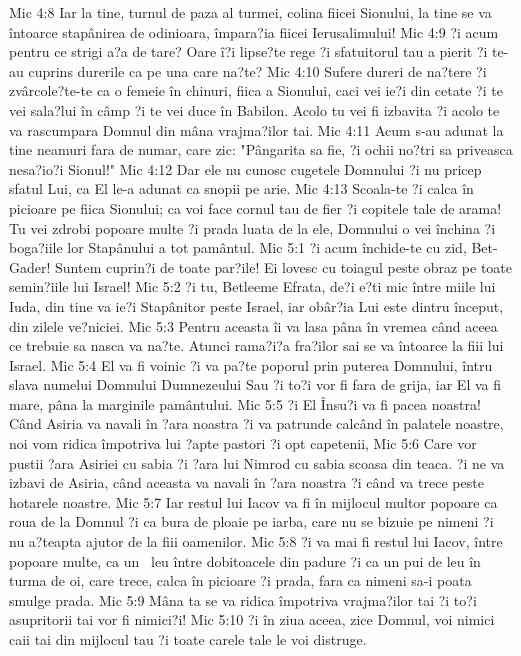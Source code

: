 Mic 4:8  Iar la tine, turnul de paza al turmei, colina fiicei Sionului, la tine se va întoarce stapânirea de odinioara, împara?ia fiicei Ierusalimului!
Mic 4:9  ?i acum pentru ce strigi a?a de tare? Oare î?i lipse?te rege ?i sfatuitorul tau a pierit ?i te-au cuprins durerile ca pe una care na?te?
Mic 4:10  Sufere dureri de na?tere ?i zvârcole?te-te ca o femeie în chinuri, fiica a Sionului, caci vei ie?i din cetate ?i te vei sala?lui în câmp ?i te vei duce în Babilon. Acolo tu vei fi izbavita ?i acolo te va rascumpara Domnul din mâna vrajma?ilor tai.
Mic 4:11  Acum s-au adunat la tine neamuri fara de numar, care zic: "Pângarita sa fie, ?i ochii no?tri sa priveasca nesa?io?i Sionul!"
Mic 4:12  Dar ele nu cunosc cugetele Domnului ?i nu pricep sfatul Lui, ca El le-a adunat ca snopii pe arie.
Mic 4:13  Scoala-te ?i calca în picioare pe fiica Sionului; ca voi face cornul tau de fier ?i copitele tale de arama! Tu vei zdrobi popoare multe ?i prada luata de la ele, Domnului o vei închina ?i boga?iile lor Stapânului a tot pamântul.
Mic 5:1  ?i acum închide-te cu zid, Bet-Gader! Suntem cuprin?i de toate par?ile! Ei lovesc cu toiagul peste obraz pe toate semin?iile lui Israel!
Mic 5:2  ?i tu, Betleeme Efrata, de?i e?ti mic între miile lui Iuda, din tine va ie?i Stapânitor peste Israel, iar obâr?ia Lui este dintru început, din zilele ve?niciei.
Mic 5:3  Pentru aceasta îi va lasa pâna în vremea când aceea ce trebuie sa nasca va na?te. Atunci rama?i?a fra?ilor sai se va întoarce la fiii lui Israel.
Mic 5:4  El va fi voinic ?i va pa?te poporul prin puterea Domnului, întru slava numelui Domnului Dumnezeului Sau ?i to?i vor fi fara de grija, iar El va fi mare, pâna la marginile pamântului.
Mic 5:5  ?i El Însu?i va fi pacea noastra! Când Asiria va navali în ?ara noastra ?i va patrunde calcând în palatele noastre, noi vom ridica împotriva lui ?apte pastori ?i opt capetenii,
Mic 5:6  Care vor pustii ?ara Asiriei cu sabia ?i ?ara lui Nimrod cu sabia scoasa din teaca. ?i ne va izbavi de Asiria, când aceasta va navali în ?ara noastra ?i când va trece peste hotarele noastre.
Mic 5:7  Iar restul lui Iacov va fi în mijlocul multor popoare ca roua de la Domnul ?i ca bura de ploaie pe iarba, care nu se bizuie pe nimeni ?i nu a?teapta ajutor de la fiii oamenilor.
Mic 5:8  ?i va mai fi restul lui Iacov, între popoare multe, ca un  leu între dobitoacele din padure ?i ca un pui de leu în turma de oi, care trece, calca în picioare ?i prada, fara ca nimeni sa-i poata smulge prada.
Mic 5:9  Mâna ta se va ridica împotriva vrajma?ilor tai ?i to?i asupritorii tai vor fi nimici?i!
Mic 5:10  ?i în ziua aceea, zice Domnul, voi nimici caii tai din mijlocul tau ?i toate carele tale le voi distruge.
